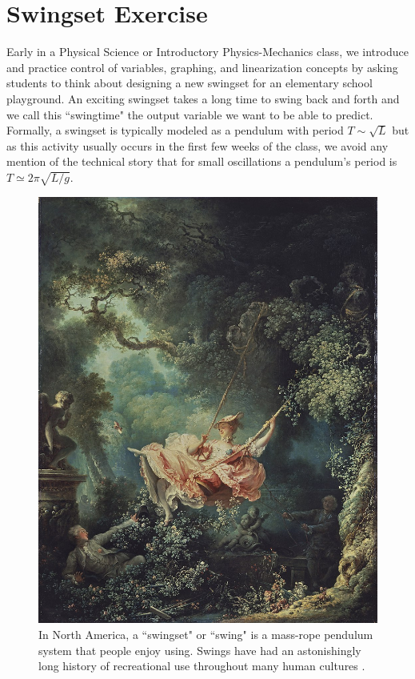\documentclass[12pt]{iopart}
\begin{document}
\section{Swingset Exercise}
Early in a Physical Science or Introductory Physics-Mechanics class, we introduce and practice control of variables, graphing, and linearization concepts by asking students to think about designing a new swingset for an elementary school playground.  
An exciting swingset takes a long time to swing back and forth and we call this ``swingtime" the output variable we want to be able to predict.
Formally, a swingset is typically modeled as a pendulum with period 
$T \sim \sqrt{L}$ \cite{openstax_pendulum, pivot_pendulum} but as this activity usually occurs in the first few weeks of the class, we avoid any mention of the technical story that for small oscillations a pendulum's period is $T\simeq 2\pi \sqrt{L/g}$.

\begin{figure}[h]
\centering
        \includegraphics[width=\columnwidth]{Fragonard,_The_Swing.jpg}
\caption{
In North America, a ``swingset" or ``swing" is a mass-rope pendulum system that people enjoy using.
        Swings have had an astonishingly long history of recreational use throughout many human cultures \cite{swings-wikipedia}.
}
\label{buffet}
\end{figure}
\end{document}
